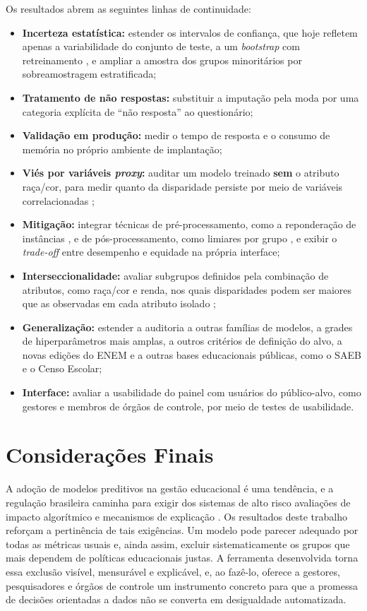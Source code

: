 Os resultados abrem as seguintes linhas de continuidade:
\begin{itemize}
    \item \textbf{Incerteza estatística:} estender os intervalos de confiança, que hoje refletem apenas a variabilidade do conjunto de teste, a um \textit{bootstrap} com retreinamento \cite{efron1993bootstrap}, e ampliar a amostra dos grupos minoritários por sobreamostragem estratificada;
    \item \textbf{Tratamento de não respostas:} substituir a imputação pela moda por uma categoria explícita de ``não resposta'' ao questionário;
    \item \textbf{Validação em produção:} medir o tempo de resposta e o consumo de memória no próprio ambiente de implantação;
    \item \textbf{Viés por variáveis \textit{proxy}:} auditar um modelo treinado \textbf{sem} o atributo raça/cor, para medir quanto da disparidade persiste por meio de variáveis correlacionadas \cite{dwork2012fairness};
    \item \textbf{Mitigação:} integrar técnicas de pré-processamento, como a reponderação de instâncias \cite{kamiran2012data}, e de pós-processamento, como limiares por grupo \cite{hardt2016equality}, e exibir o \textit{trade-off} entre desempenho e equidade na própria interface;
    \item \textbf{Interseccionalidade:} avaliar subgrupos definidos pela combinação de atributos, como raça/cor e renda, nos quais disparidades podem ser maiores que as observadas em cada atributo isolado \cite{buolamwini2018gender};
    \item \textbf{Generalização:} estender a auditoria a outras famílias de modelos, a grades de hiperparâmetros mais amplas, a outros critérios de definição do alvo, a novas edições do ENEM e a outras bases educacionais públicas, como o SAEB e o Censo Escolar;
    \item \textbf{Interface:} avaliar a usabilidade do painel com usuários do público-alvo, como gestores e membros de órgãos de controle, por meio de testes de usabilidade.
\end{itemize}

\section{Considerações Finais}

A adoção de modelos preditivos na gestão educacional é uma tendência, e a regulação brasileira caminha para exigir dos sistemas de alto risco avaliações de impacto algorítmico e mecanismos de explicação \cite{brasil2018lgpd, brasil2023pl2338}. Os resultados deste trabalho reforçam a pertinência de tais exigências. Um modelo pode parecer adequado por todas as métricas usuais e, ainda assim, excluir sistematicamente os grupos que mais dependem de políticas educacionais justas. A ferramenta desenvolvida torna essa exclusão visível, mensurável e explicável, e, ao fazê-lo, oferece a gestores, pesquisadores e órgãos de controle um instrumento concreto para que a promessa de decisões orientadas a dados não se converta em desigualdade automatizada.
